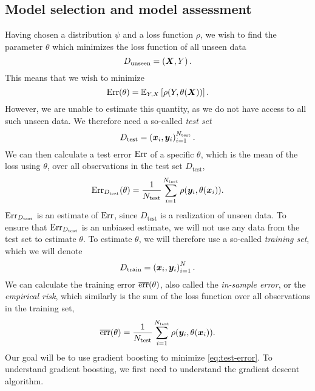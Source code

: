 \subsection{Model selection and model assessment}
Having chosen a distribution $\psi$ and a loss function $\rho$, we wish to find the parameter $\theta$ which minimizes the loss function of all unseen data
\begin{equation*}
    D_{\text{unseen}}=\left(\bm{X},Y\right).
\end{equation*}
This means that we wish to minimize
\begin{equation}\label{eq:unseen-error}
    \text{Err}(\theta)=\mathbb{E}_{Y,X}\left[\rho(Y,\theta(\bm{X}))\right].
\end{equation}
However, we are unable to estimate this quantity, as we do not have access to all such unseen data.
We therefore need a so-called \textit{test set}
\begin{equation*}
    D_{\text{test}}=\left(\bm{x}_i,\bm{y}_i\right)_{i=1}^{N_{\text{test}}}.
\end{equation*}
We can then calculate a test error $\text{Err}$ of a specific $\theta$, which is the mean of the loss using $\theta$, over all observations in the test set $D_{\text{test}}$,
\begin{equation*}%
    \Err_{D_{\text{test}}}(\theta)=\frac{1}{N_{\text{test}}}\sum_{i=1}^{N_{\text{test}}} \rho(\y_i,\theta(\x_i)).
\end{equation*}
$\text{Err}_{D_{\text{test}}}$ is an estimate of $\text{Err}$, since $D_{\text{test}}$ is a realization of unseen data.
To ensure that $\text{Err}_{D_{\text{test}}}$ is an unbiased estimate, we will not use any data from the test set to estimate $\theta$.
To estimate $\theta$, we will therefore use a so-called \textit{training set}, which we will denote
\begin{equation*}
    D_{\text{train}}=\left(\bm{x}_i,\bm{y}_i\right)_{i=1}^{N}.
\end{equation*}
We can calculate the training error $\overline{\text{err}}(\theta)$, also called the \textit{in-sample error}, or the \textit{empirical risk}, which similarly is the sum of the loss function over all observations in the training set,
\begin{equation*}
    \overline{\text{err}}(\theta)=\frac{1}{N_{\text{test}}}\sum_{i=1}^{N_{\text{test}}} \rho(\bm{y}_i,\theta(\bm{x}_i)).
\end{equation*}
Our goal will be to use gradient boosting to minimize \ref{eq:test-error}.
To understand gradient boosting, we first need to understand the gradient descent algorithm.

